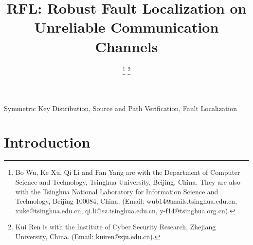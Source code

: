 \documentclass[journal]{IEEEtran}
\newcommand{\name}{RFL}
\begin{document}
%
\title{\name{}: Robust Fault Localization on Unreliable Communication Channels}

\iffalse
\author{
\IEEEauthorblockN{Bo Wu\IEEEauthorrefmark{1},  Ke Xu\IEEEauthorrefmark{1}, Qi Li\IEEEauthorrefmark{1}, Fan Yang\IEEEauthorrefmark{1}}

\IEEEauthorblockA{\IEEEauthorrefmark{1}Department of Computer Science and Technology, Tsinghua University, Beijing, China \\Emails: {wub14@mails.tsinghua.edu.cn, xuke@tsinghua.edu.cn, qi.li@sz.tsinghua.edu.cn, y-f14@tsinghua.org.cn}}
}
\fi

\author{\IEEEauthorblockN{}

\thanks{Bo Wu, Ke Xu, Qi Li and Fan Yang are with the Department of Computer Science and Technology, Tsinghua University, Beijing, China. They are also with the Tsinghua National Laboratory for Information Science and Technology, Beijing 100084, China. (Email: wub14@mails.tsinghua.edu.cn, xuke@tsinghua.edu.cn, qi.li@sz.tsinghua.edu.cn, y-f14@tsinghua.org.cn).}
\thanks{Kui Ren is with the Institute of Cyber Security Research, Zhejiang University, China. (Email: kuiren@zju.edu.cn).}
}

\maketitle


\begin{abstract}

\end{abstract}
\begin{IEEEkeywords}
Symmetric Key Distribution, Source and Path Verification, Fault Localization
\end{IEEEkeywords}

\section{Introduction}

\end{document}
